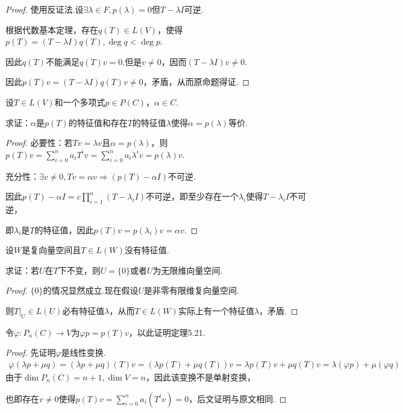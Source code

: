 \begin{proof}
    使用反证法.设\(\exists \lambda \in F,p(\lambda)=0\)但\(T-\lambda I\)可逆.

    根据代数基本定理，存在\(q(T) \in L(V)\)，使得\(p(T)=(T-\lambda I)q(T),\operatorname{deg} q<\operatorname{deg} p\).
    
    因此\(q(T)\)不能满足\(q(T)v=0\).但是\(v \ne 0\)，因而\((T-\lambda I)v \ne 0\).
    
    因此\(p(T)v=(T-\lambda I)q(T)v \ne 0\)，矛盾，从而原命题得证.
\end{proof}

\begin{problem}[11]\label{5.B.11}
    设\(T \in L(V)\)和一个多项式\(p \in P(C)\)，\(\alpha \in C\).

    求证：\(\alpha\)是\(p(T)\)的特征值和存在\(T\)的特征值\(\lambda\)使得\(\alpha=p(\lambda)\)等价.
\end{problem}

\begin{proof}
    必要性：若\(Tv=\lambda v\)且\(\alpha=p(\lambda)\)，则\(p(T)v=\sum_{i=0}^n a_iT^iv=\sum_{i=0}^n a_i\lambda^iv=p(\lambda)v\).

    充分性：\(\exists v \ne 0,Tv=\alpha v \Rightarrow (p(T)-\alpha I)\)不可逆.
    
    因此\(p(T)-\alpha I=c\prod_{i=1}^n (T-\lambda_i I)\)不可逆，即至少存在一个\(\lambda_i\)使得\(T-\lambda_i I\)不可逆，
    
    即\(\lambda_i\)是\(T\)的特征值，因此\(p(T)v=p(\lambda_i)v=\alpha v\).
\end{proof}

\begin{problem}[13]\label{5.B.13}
    设\(W\)是复向量空间且\(T \in L(W)\)没有特征值.

    求证：若\(U\)在\(T\)下不变，则\(U=\{0\}\)或者\(U\)为无限维向量空间.
\end{problem}

\begin{proof}
    \(\{0\}\)的情况显然成立.现在假设\(U\)是非零有限维复向量空间.

    则\(T|_U \in L(U)\)必有特征值\(\lambda\)，从而\(T \in L(W)\)实际上有一个特征值\(\lambda\)，矛盾.
\end{proof}

\begin{problem}[16]\label{5.B.16}
    令\(\varphi:P_n(C) \rightarrow V\)为\(\varphi p=p(T)v\)，以此证明定理5.21.
\end{problem}

\begin{proof}
    先证明\(\varphi\)是线性变换.
    \begin{align*}
        \varphi(\lambda p+\mu q)=(\lambda p+\mu q)(T)v=(\lambda p(T)+\mu q(T))v
        =\lambda p(T)v+\mu q(T)v=\lambda(\varphi p)+\mu(\varphi q)
    \end{align*}
    由于\(\dim P_n(C)=n+1,\dim V=n\)，因此该变换不是单射变换，

    也即存在\(v \ne 0\)使得\(p(T)v=\sum_{i=0}^n a_i(T^iv)=0\)，后文证明与原文相同.
\end{proof}

